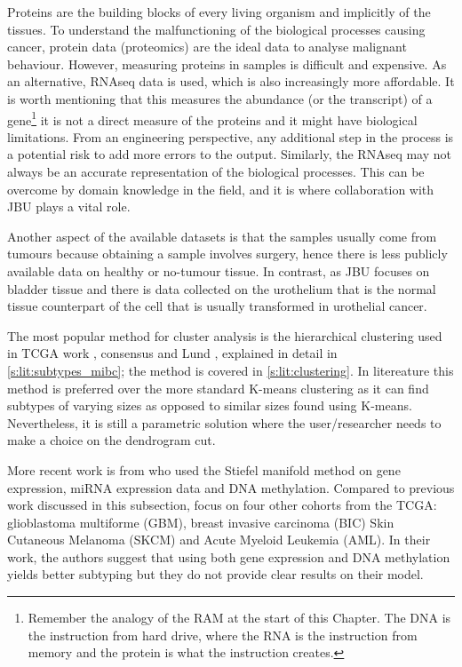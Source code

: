 Proteins are the building blocks of every living organism and implicitly of the tissues. To understand the malfunctioning of the biological processes causing cancer, protein data (proteomics) are the ideal data to analyse malignant behaviour. However, measuring proteins in samples is difficult and expensive. As an alternative, RNAseq data is used, which is also increasingly more affordable. It is worth mentioning that this measures the abundance (or the transcript) of a gene\footnote{Remember the analogy of the RAM at the start of this Chapter. The DNA is the instruction from hard drive, where the RNA is the instruction from memory and the protein is what the instruction creates.} it is not a direct measure of the proteins and it might have biological limitations. From an engineering perspective, any additional step in the process is a potential risk to add more errors to the output. Similarly, the RNAseq may not always be an accurate representation of the biological processes. This can be overcome by domain knowledge in the field, and it is where collaboration with JBU plays a vital role.

Another aspect of the available datasets is that the samples usually come from tumours because obtaining a sample involves surgery, hence there is less publicly available data on healthy or no-tumour tissue. In contrast, as JBU focuses on bladder tissue  and there is data collected on the urothelium that is the normal tissue counterpart of the cell that is usually transformed in urothelial cancer.

The most popular method for cluster analysis is the hierarchical clustering used in TCGA work \citep{Robertson2017-mg}, consensus \citep{Kamoun2020-tj} and Lund \citep{Sjodahl2017-xr}, explained in detail in \cref{s:lit:subtypes_mibc}; the method is covered in \cref{s:lit:clustering}. In litereature this method is preferred over the more standard K-means clustering as it can find subtypes of varying sizes as opposed to similar sizes found using K-means. Nevertheless, it is still a parametric solution where the user/researcher needs to make a choice on the dendrogram cut.

More recent work is from \citet{Tian2021-vu} who used the Stiefel manifold method on gene expression, miRNA expression data and DNA methylation. Compared to previous work discussed in this subsection, \citet{Tian2021-vu} focus on four other cohorts from the TCGA: glioblastoma multiforme (GBM), breast invasive carcinoma (BIC) Skin Cutaneous Melanoma (SKCM) and Acute Myeloid Leukemia (AML). In their work, the authors suggest that using both gene expression and DNA methylation yields better subtyping but they do not provide clear results on their model.

